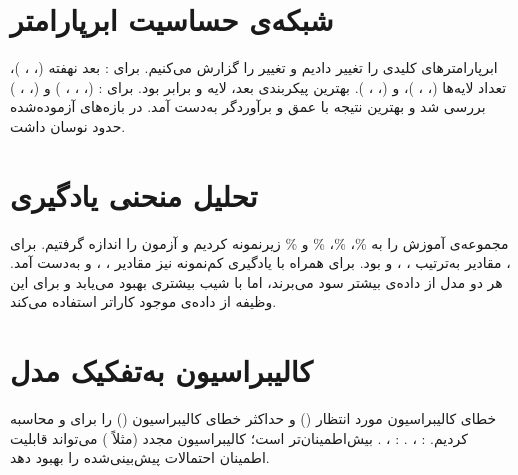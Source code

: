 \section{شبکه‌ی حساسیت ابرپارامتر}

ابرپارامترهای کلیدی را تغییر دادیم و تغییر  را گزارش می‌کنیم. برای : بعد نهفته (، ، )، تعداد لایه‌ها (، ، )، و  (، ، ). بهترین پیکربندی  بعد،  لایه و  برابر  بود. برای :  (، ، ، ) و  (، ، ) بررسی شد و بهترین نتیجه با عمق  و  برآوردگر به‌دست آمد.  در بازه‌های آزموده‌شده حدود  نوسان داشت.

\section{تحلیل منحنی یادگیری}

مجموعه‌ی آموزش را به \%، \%، \% و \% زیرنمونه کردیم و  آزمون را اندازه گرفتیم. برای ، مقادیر به‌ترتیب ، ،  و  بود. برای  همراه با یادگیری کم‌نمونه نیز مقادیر ، ،  و  به‌دست آمد. هر دو مدل از داده‌ی بیشتر سود می‌برند، اما  با شیب بیشتری بهبود می‌یابد و برای این وظیفه از داده‌ی موجود کاراتر استفاده می‌کند.

\section{کالیبراسیون به‌تفکیک مدل}

خطای کالیبراسیون مورد انتظار () و حداکثر خطای کالیبراسیون () را برای  و  محاسبه کردیم. :  ،  . :  ،  .  بیش‌اطمینان‌تر است؛ کالیبراسیون مجدد (مثلاً ) می‌تواند قابلیت اطمینان احتمالات پیش‌بینی‌شده را بهبود دهد.

